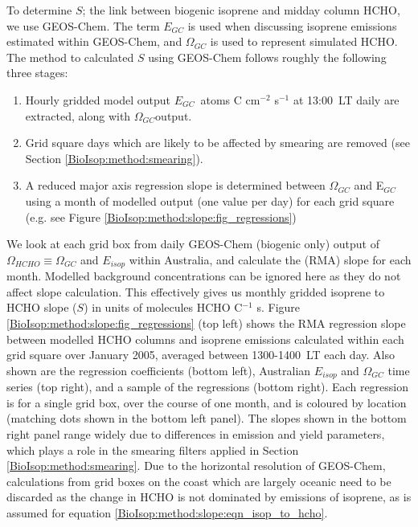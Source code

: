     To determine $S$; the link between biogenic isoprene and midday column HCHO, we use GEOS-Chem.
    The term $E_{GC}$ is used when discussing isoprene emissions estimated within GEOS-Chem, and $\Omega_{GC}$ is used to represent simulated HCHO.
    The method to calculated $S$ using GEOS-Chem follows roughly the following three stages: 
    \begin{enumerate}
      \item 
      Hourly gridded model output $E_{GC}$~atoms C cm$^{-2}$ s$^{-1}$ at 13:00~LT daily are extracted, along with $\Omega_{GC}$\moleccm output.
      \item
      Grid square days which are likely to be affected by smearing are removed (see Section \ref{BioIsop:method:smearing}).
      \item 
      A reduced major axis regression slope is determined between $\Omega_{GC}$ and E$_{GC}$ using a month of modelled output (one value per day) for each grid square (e.g. see Figure \ref{BioIsop:method:slope:fig_regressions})
    \end{enumerate}
    
    We look at each \lowhr grid box from daily GEOS-Chem (biogenic only) output of $\Omega_{HCHO} \equiv \Omega_{GC}$ and $E_{isop}$ within Australia, and calculate the (RMA) slope for each month.
    Modelled background concentrations can be ignored here as they do not affect slope calculation.
    This effectively gives us monthly gridded isoprene to HCHO slope ($S$) in units of molecules HCHO C$^{-1}$ s.
    Figure \ref{BioIsop:method:slope:fig_regressions} (top left) shows the RMA regression slope between modelled HCHO columns and isoprene emissions calculated within each grid square over January 2005, averaged between 1300-1400~LT each day.
    Also shown are the regression coefficients (bottom left), Australian $E_{isop}$ and $\Omega_{GC}$ time series (top right), and a sample of the regressions (bottom right).
    Each regression is for a single grid box, over the course of one month, and is coloured by location (matching dots shown in the bottom left panel).
    The slopes shown in the bottom right panel range widely due to differences in emission and yield parameters, which plays a role in the smearing filters applied in Section \ref{BioIsop:method:smearing}.
    Due to the \lowhr horizontal resolution of GEOS-Chem, calculations from grid boxes on the coast which are largely oceanic need to be discarded as the change in HCHO is not dominated by emissions of isoprene, as is assumed for equation \ref{BioIsop:method:slope:eqn_isop_to_hcho}.
    
